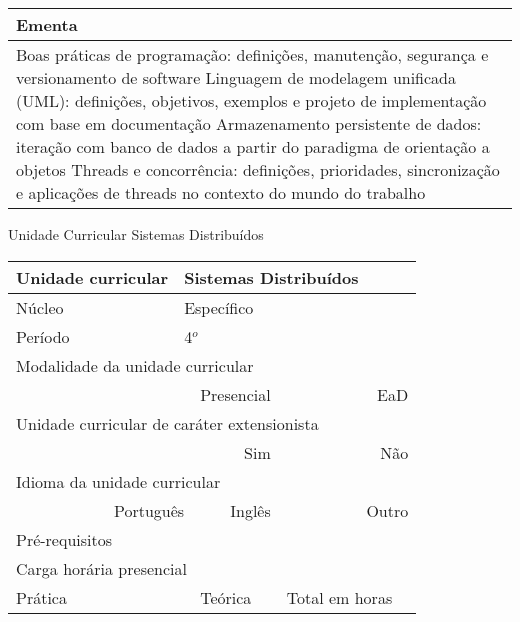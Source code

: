 \begin{quadro}[ht!]
\begin{tabular}{|p{3cm} p{2cm} p{3cm} p{2cm} p{3cm} p{2cm}|}
\multicolumn{6}{|p{15cm}|}{\cellcolor{blue1} Ementa} \\\hline
\hline\multicolumn{6}{|p{15cm}|}{\scriptsize Boas práticas de programação: definições, manutenção, segurança e versionamento de software Linguagem de modelagem unificada (UML): definições, objetivos, exemplos e projeto de implementação com base em documentação Armazenamento persistente de dados: iteração com banco de dados a partir do paradigma de orientação a objetos Threads e concorrência: definições, prioridades, sincronização e aplicações de threads no contexto do mundo do trabalho}\\\hline 
\hline
	\end{tabular}
\end{quadro}


\begin{quadro}[ht!]
  \centering\scriptsize
\caption{Unidade Curricular Sistemas Distribuídos}
\begin{tabular}{|p{3cm} p{2cm} p{3cm} p{2cm} p{3cm} p{2cm}|}\hline
\multicolumn{1}{|p{3cm}|}{\cellcolor{blue1} Unidade curricular} & \multicolumn{5}{p{9cm}|}{Sistemas Distribuídos}\\\hline
\multicolumn{1}{|p{3cm}|}{\cellcolor{blue1} Núcleo} & \multicolumn{5}{p{11.5cm}|}{Específico}\\\hline
\multicolumn{1}{|p{3cm}|}{\cellcolor{blue1} Período} & \multicolumn{5}{p{9cm}|}{4$^o$}\\\hline
\multicolumn{6}{|p{15cm}|}{\cellcolor{blue1} Modalidade da unidade curricular} \\\hline
\multicolumn{2}{|r}{		} &  \multicolumn{2}{r}{Presencial \XBox} & \multicolumn{2}{r|}{EaD \Square	} \\\hline
\multicolumn{6}{|p{15cm}|}{\cellcolor{blue1} Unidade curricular de caráter extensionista} \\\hline
\multicolumn{4}{|r}{			Sim \XBox	} & \multicolumn{2}{r|}{	Não \Square	}\\\hline
\multicolumn{6}{|p{15cm}|}{\cellcolor{blue1} Idioma da unidade curricular} \\ \hline
\multicolumn{2}{|r}{	Português \XBox	} &  \multicolumn{2}{r}{	Inglês \Square	} & \multicolumn{2}{r|}{	Outro \Square	} \\ \hline
\multicolumn{1}{|p{3cm}|}{\cellcolor{blue1} Pré-requisitos} & \multicolumn{5}{p{9cm}|}{}\\ \hline
\multicolumn{6}{|p{15cm}|}{\cellcolor{blue1} Carga horária presencial} \\ \hline
\multicolumn{1}{|p{3cm}|}{\raggedleft Prática} & \multicolumn{1}{p{1cm}|}{\centering	30	} &  \multicolumn{1}{p{3cm}|}{\raggedleft Teórica}  & \multicolumn{1}{p{1cm}|}{\centering 	30	} & \multicolumn{1}{p{3cm}|}{\raggedleft Total em horas} & \multicolumn{1}{p{1cm}|}{\raggedleft	60	} \\ \hline 

\end{tabular}
\end{quadro}
